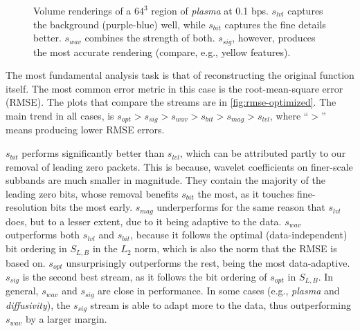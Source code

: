 \begin{figure}[t]
	\centering
	\caption{Volume renderings of a $64^3$ region of \emph{plasma} at 0.1 bps. $s_{lvl}$ captures the background (purple-blue) well, while $s_{bit}$ captures the fine details better. $s_{wav}$
	combines the strength of both. $s_{sig}$, however, produces the most accurate rendering (compare,
	e.g., yellow features).}\label{fig:rmse-rendering}
\end{figure}

The most fundamental analysis task is that of reconstructing the original function itself. The most
common error metric in this case is the root-mean-square error (RMSE). The plots that compare the
streams are in \cref{fig:rmse-optimized}. The main trend in all cases, is $s_{opt} > s_{sig} >
s_{wav} > s_{bit} > s_{mag} > s_{lvl}$, where ``$>$'' means producing lower RMSE errors.

$s_{bit}$ performs significantly better than $s_{lvl}$, which can be attributed partly to our
removal of leading zero packets. This is because, wavelet coefficients on finer-scale subbands are
much smaller in magnitude. They contain the majority of the leading zero bits, whose removal
benefits $s_{bit}$ the most, as it touches fine-resolution bits the most early. $s_{mag}$
underperforms for the same reason that $s_{lvl}$ does, but to a lesser extent, due to it being
adaptive to the data. $s_{wav}$ outperforms both $s_{lvl}$ and $s_{bit}$, because it follows the
optimal (data-independent) bit ordering in $S_{L,B}$ in the $L_2$ norm, which is also the norm that
the RMSE is based on. $s_{opt}$ unsurprisingly outperforms the rest, being the most data-adaptive.
$s_{sig}$ is the second best stream, as it follows the bit ordering of $s_{opt}$ in $S_{L,B}$. In
general, $s_{wav}$ and $s_{sig}$ are close in performance. In some cases (e.g., \emph{plasma} and
\emph{diffusivity}), the $s_{sig}$ stream is able to adapt more to the data, thus outperforming
$s_{wav}$ by a larger margin.

